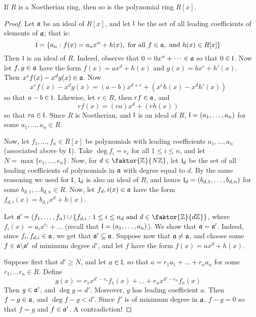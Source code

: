 \begin{theorem}\label{theorem_5.9.3}
  If $R$ is a Noetherian ring, then so is the polynomial ring $R[x]$.
\end{theorem}
\begin{proof}
  Let $\mathfrak{a}$ be an ideal of $R[x]$, and let $\mathfrak{l}$ be the set of all
  leading coefficients of elements of $\mathfrak{a}$; that is:
  \begin{equation*}
    \mathfrak{l}=\{ a_n : f(x)=a_nx^n+h(x), \text{ for all }
    f \in \mathfrak{a}, \text{ and } h(x) \in R[x]  \}
  \end{equation*}
  Then $\mathfrak{l}$ is an ideal of $R$. Indeed, observe that $0=0x^n+\dots
  \in \mathfrak{a}$ so that $0 \in \mathfrak{l}$. Now let $f,g \in \mathfrak{a}$ have the
  form $f(x)=ax^d+h(x)$ and $g(x)=bx^e+h'(x)$. Then $x^ef(x)-x^dg(x)
  \in \mathfrak{a}$. Now
  \begin{equation*}
    x^ef(x)-x^dg(x)=(a-b)x^{d+e}+(x^eh(x)-x^dh'(x))
  \end{equation*}
  so that $a-b \in \mathfrak{l}$. Likewise, let $r \in R$, then $rf \in \mathfrak{a}$,
  and
  \begin{equation*}
    rf(x)=(ra)x^d+(rh(x))
  \end{equation*}
  so that $ra \in \mathfrak{l}$. Since $R$ is Noetherian, and $\mathfrak{l}$ is an ideal
  of $R$,  $\mathfrak{l}=(a_1, \dots, a_n)$ for some $a_1, \dots, a_n \in R$.

  Now, let $f_1, \dots, f_n \in R[x]$ be polynomials with leading
  coefficients $a_1, \dots, a_n$ (associated above by $\mathfrak{l}$). Take
  $\deg{f_i}=e_i$ for all $1 \leq i \leq n$, and let $N=\max{\{e_1,
  \dots, e_n\}}$. Now, for $d \in \faktor{\Z}{N\Z}$, let $\mathfrak{l}_d$ be
  the set of all leading coefficients of polynomials in $\mathfrak{a}$ with
  degree equal to $d$. By the same reasoning we used for $\mathfrak{l}$,
  $\mathfrak{l}_d$ is also an ideal of $R$, and hence $\mathfrak{l}_d=(b_{d,1}, \dots,
  b_{d,n})$ for some $b_{d,1}, \dots b_{d,n} \in R$. Now, let
  $f_d,i(x) \in \mathfrak{a}$ have the form $f_{d,i}(x)=b_{d,i}x^d+h(x)$.

  Let $\af'=(f_1, \dots, f_n) \cup \{f_{d,i} : 1 \leq i \leq n_d
  \text{ and } d \in \faktor{\Z}{d\Z}\}$, where
  $f_i(x)=a_ix^{e_i}+\dots$ (recall that $\mathfrak{l}=(a_1, \dots, a_n)$). We
  show that $\mathfrak{a}=\mathfrak{a}'$. Indeed, since $f_i,f_{d,i} \in \mathfrak{a}$, we get
  that $\mathfrak{a}' \subseteq \mathfrak{a}$. Suppose now that $\mathfrak{a} \neq \mathfrak{a}$, and
  choose some $f \in \mathfrak{a} \backslash \mathfrak{a}'$ of minimum degree $d'$, and let
  $f$ have the form $f(x)=ax^d+h(x)$.

  Suppose first that $d' \geq N$, and let $a \in \mathfrak{l}$, so that
  $a=r_1a_1+\dots+r_na_n$ for some $r_1, \dots r_n \in R$. Define
  \begin{equation*}
    g(x)=r_1x^{d'-e_1}f_1(x)+\dots+r_nx^{d'-e_n}f_n(x)
  \end{equation*}
  Then $g \in \mathfrak{a}'$, and $\deg{g}=d'$. Moreover, $g$ has leading
  coefficient $a$. Then $f-g \in \mathfrak{a}$, and $\deg{f-g}<d'$. Since $f'$ is
  of minimum degree in  $\mathfrak{a}$, $f-g=0$ so that  $f=g$ and  $f \in
  \mathfrak{a}'$. A contradiction!


\end{proof}
